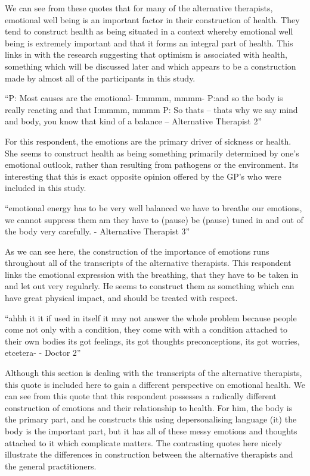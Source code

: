 We can see from these quotes that for many of the alternative therapists, emotional well being is an important factor in their construction of health. They tend to construct health as being situated in a context whereby emotional well being is extremely important and that it forms an integral part of health. This links in with the research suggesting that optimism is associated with health, something which will be discussed later and which appears to be a construction made by almost all of the participants in this study. 

``P: Most causes are the emotional-
I:mmmm, mmmm-
P:and so the body is really reacting and that
I:mmmm, mmmm
P: So thats – thats why we say mind and body, you know that kind of a balance – Alternative Therapist 2''

For this respondent, the emotions are the primary driver of sickness or health. She seems to construct health as being something primarily determined by one's emotional outlook, rather than resulting from pathogens or the environment. Its interesting that this is exact opposite opinion offered by the GP's who were included in this study. 

``emotional energy has to be very well balanced we have to breathe our emotions, we cannot suppress them am they have to (pause) be (pause) tuned in and out of the body very carefully. - Alternative Therapist 3''

As we can see here, the construction of the importance of emotions runs throughout all of the transcripts of the alternative therapists. This respondent links the emotional expression with the breathing, that they have to be taken in and let out very regularly. He seems to construct them as something which can have great physical impact, and should be treated with respect.


``ahhh it it if used in itself it may not answer the whole problem because people come not only with a condition, they come with with a condition attached to their own bodies its got feelings, its got thoughts preconceptions, its got worries, etcetera- - Doctor 2''

Although this section is dealing with the transcripts of the alternative therapists, this quote is included here to gain a different perspective on emotional health. We can see from this quote that this respondent possesses a radically different construction of emotions and their relationship to health. For him, the body is the primary part, and he constructs this using depersonalising language (it) the body is the important part, but it has all of these messy emotions and thoughts attached to it which complicate matters. The contrasting quotes here nicely illustrate the differences in construction between the alternative therapists and the general practitioners. 



